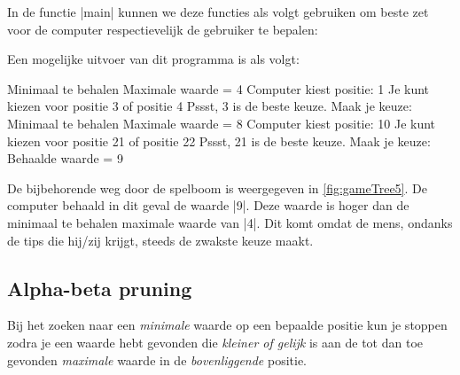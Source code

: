 \begin{cpplstShortInline}

In de functie |main| kunnen we deze functies als volgt gebruiken om beste zet voor de computer respectievelijk de gebruiker te bepalen:


Een mogelijke uitvoer van dit programma  is als volgt:
\begin{coutput}
Minimaal te behalen Maximale waarde = 4
Computer kiest positie: 1
Je kunt kiezen voor positie 3 of positie 4
Pssst, 3 is de beste keuze.
Maak je keuze: 
Minimaal te behalen Maximale waarde = 8
Computer kiest positie: 10
Je kunt kiezen voor positie 21 of positie 22
Pssst, 21 is de beste keuze.
Maak je keuze: 
Behaalde waarde = 9
\end{coutput}

De bijbehorende weg door de spelboom is weergegeven in \cref{fig:gameTree5}.
De computer behaald in dit geval de waarde |9|.
Deze waarde is hoger dan de minimaal te behalen maximale waarde van |4|.
Dit komt omdat de mens, ondanks de tips die hij/zij krijgt, steeds de zwakste keuze maakt.


\subsection{Alpha\hyp{}beta pruning}
\label{sec:alphaBetaPruning}
Bij het zoeken naar een \emph{minimale} waarde op een bepaalde positie kun je stoppen zodra je een waarde hebt gevonden die \emph{kleiner of gelijk} is aan de tot dan toe gevonden \emph{maximale} waarde in de \emph{bovenliggende} positie.



\end{cpplstShortInline}
